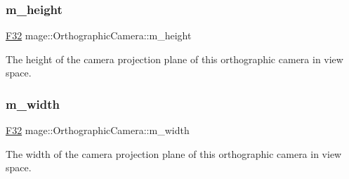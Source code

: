 \subsubsection{\texorpdfstring{m\+\_\+height}{m\_height}}
{\footnotesize\ttfamily \hyperlink{namespacemage_aa97e833b45f06d60a0a9c4fc22ae02c0}{F32} mage\+::\+Orthographic\+Camera\+::m\+\_\+height\hspace{0.3cm}{\ttfamily [private]}}

The height of the camera projection plane of this orthographic camera in view space. \hypertarget{classmage_1_1_orthographic_camera_a78586ef1dfd4e1ffa5d9b32378a1e7f8}{}\label{classmage_1_1_orthographic_camera_a78586ef1dfd4e1ffa5d9b32378a1e7f8} 
\subsubsection{\texorpdfstring{m\+\_\+width}{m\_width}}
{\footnotesize\ttfamily \hyperlink{namespacemage_aa97e833b45f06d60a0a9c4fc22ae02c0}{F32} mage\+::\+Orthographic\+Camera\+::m\+\_\+width\hspace{0.3cm}{\ttfamily [private]}}

The width of the camera projection plane of this orthographic camera in view space. 